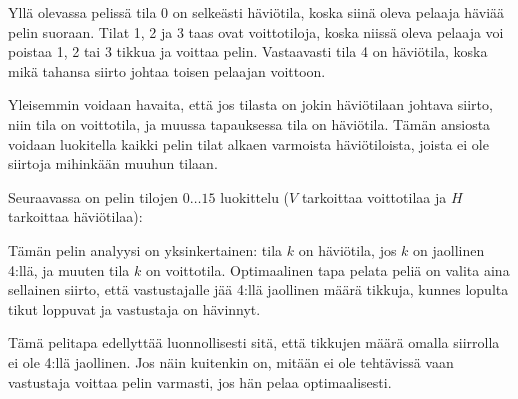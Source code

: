 Yllä olevassa pelissä tila 0 on selkeästi häviötila,
koska siinä oleva pelaaja häviää pelin suoraan.
Tilat 1, 2 ja 3 taas ovat voittotiloja,
koska niissä oleva pelaaja voi poistaa
1, 2 tai 3 tikkua ja voittaa pelin.
Vastaavasti tila 4 on häviötila, koska mikä tahansa
siirto johtaa toisen pelaajan voittoon.

Yleisemmin voidaan havaita, että jos tilasta on
jokin häviötilaan johtava siirto, niin tila on voittotila,
ja muussa tapauksessa tila on häviötila.
Tämän ansiosta voidaan luokitella kaikki pelin tilat
alkaen varmoista häviötiloista, joista ei ole siirtoja
mihinkään muuhun tilaan.

Seuraavassa on pelin tilojen $0 \ldots 15$ luokittelu
($V$ tarkoittaa voittotilaa ja $H$ tarkoittaa häviötilaa):
\begin{center}
\end{center}

Tämän pelin analyysi on yksinkertainen:
tila $k$ on häviötila, jos $k$ on jaollinen 4:llä,
ja muuten tila $k$ on voittotila.
Optimaalinen tapa pelata peliä on
valita aina sellainen siirto, että vastustajalle
jää 4:llä jaollinen määrä tikkuja,
kunnes lopulta tikut loppuvat ja vastustaja on hävinnyt.

Tämä pelitapa edellyttää luonnollisesti sitä,
että tikkujen määrä omalla siirrolla ei ole
4:llä jaollinen. Jos näin kuitenkin on, mitään ei ole
tehtävissä vaan vastustaja voittaa
pelin varmasti, jos hän pelaa optimaalisesti.

